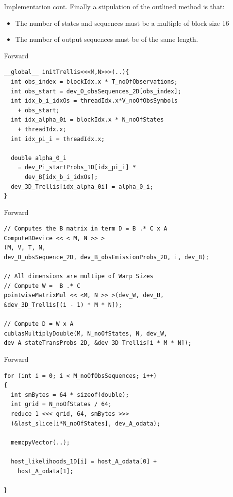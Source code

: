 \documentclass[11pt]{beamer}
\begin{document}
\begin{frame}{Implementation cont.}
Finally a stipulation of the outlined method is that:

\begin{itemize}
\item The number of states and sequences must be a multiple of block size 16
\item The number of output sequences must be of the same length.
\end{itemize}
\end{frame}

\begin{frame}[fragile]{Forward}
\begin{lstlisting}
__global__ initTrellis<<<M,N>>>(..){
  int obs_index = blockIdx.x * T_noOfObservations;
  int obs_start = dev_O_obsSequences_2D[obs_index];
  int idx_b_i_idxOs = threadIdx.x*V_noOfObsSymbols 
    + obs_start;
  int idx_alpha_0i = blockIdx.x * N_noOfStates 
    + threadIdx.x;
  int idx_pi_i = threadIdx.x;

  double alpha_0_i 
    = dev_Pi_startProbs_1D[idx_pi_i] * 
      dev_B[idx_b_i_idxOs];
  dev_3D_Trellis[idx_alpha_0i] = alpha_0_i;
}
\end{lstlisting}
\end{frame}

\begin{frame}[fragile]{Forward}
\begin{lstlisting}
// Computes the B matrix in term D = B .* C x A
ComputeBDevice << < M, N >> >
(M, V, T, N, 
dev_O_obsSequence_2D, dev_B_obsEmissionProbs_2D, i, dev_B);

// All dimensions are multipe of Warp Sizes
// Compute W =  B .* C
pointwiseMatrixMul << <M, N >> >(dev_W, dev_B,
&dev_3D_Trellis[(i - 1) * M * N]);

// Compute D = W x A
cublasMultiplyDouble(M, N_noOfStates, N, dev_W, 
dev_A_stateTransProbs_2D, &dev_3D_Trellis[i * M * N]);
\end{lstlisting}
\end{frame}

\begin{frame}[fragile]{Forward}
\begin{lstlisting}
for (int i = 0; i < M_noOfObsSequences; i++)
{
  int smBytes = 64 * sizeof(double);
  int grid = N_noOfStates / 64;
  reduce_1 <<< grid, 64, smBytes >>>
  (&last_slice[i*N_noOfStates], dev_A_odata);

  memcpyVector(..);

  host_likelihoods_1D[i] = host_A_odata[0] + 
    host_A_odata[1];

}
\end{lstlisting}
\end{frame}
\end{document}
